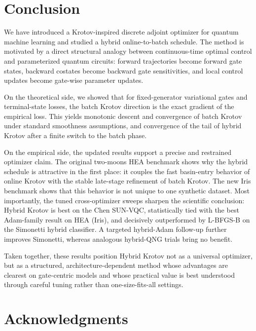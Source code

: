 \documentclass[aps,prb,10pt,twocolumn,superscriptaddress]{revtex4-2}
\begin{document}
\section{Conclusion}

We have introduced a Krotov-inspired discrete adjoint optimizer for quantum machine learning and studied a hybrid online-to-batch schedule. The method is motivated by a direct structural analogy between continuous-time optimal control and parameterized quantum circuits: forward trajectories become forward gate states, backward costates become backward gate sensitivities, and local control updates become gate-wise parameter updates.

On the theoretical side, we showed that for fixed-generator variational gates and terminal-state losses, the batch Krotov direction is the exact gradient of the empirical loss. This yields monotonic descent and convergence of batch Krotov under standard smoothness assumptions, and convergence of the tail of hybrid Krotov after a finite switch to the batch phase.

On the empirical side, the updated results support a precise and restrained optimizer claim.
The original two-moons HEA benchmark shows why the hybrid schedule is attractive in the first place: it couples the fast basin-entry behavior of online Krotov with the stable late-stage refinement of batch Krotov.
The new Iris benchmark shows that this behavior is not unique to one synthetic dataset.
Most importantly, the tuned cross-optimizer sweeps sharpen the scientific conclusion: Hybrid Krotov is best on the Chen SUN-VQC, statistically tied with the best Adam-family result on HEA (Iris), and decisively outperformed by L-BFGS-B on the Simonetti hybrid classifier. A targeted hybrid-Adam follow-up further improves Simonetti, whereas analogous hybrid-QNG trials bring no benefit.

Taken together, these results position Hybrid Krotov not as a universal optimizer, but as a structured, architecture-dependent method whose advantages are clearest on gate-centric models and whose practical value is best understood through careful tuning rather than one-size-fits-all settings.

\section*{Acknowledgments}



\appendix
\end{document}
